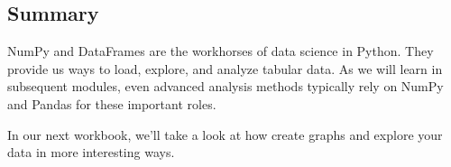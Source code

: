\documentclass[11pt]{article}
\begin{document}
    \hypertarget{summary}{%
\subsection{Summary}\label{summary}}

NumPy and DataFrames are the workhorses of data science in Python. They
provide us ways to load, explore, and analyze tabular data. As we will
learn in subsequent modules, even advanced analysis methods typically
rely on NumPy and Pandas for these important roles.

In our next workbook, we'll take a look at how create graphs and explore
your data in more interesting ways.


    
    
    
\end{document}
